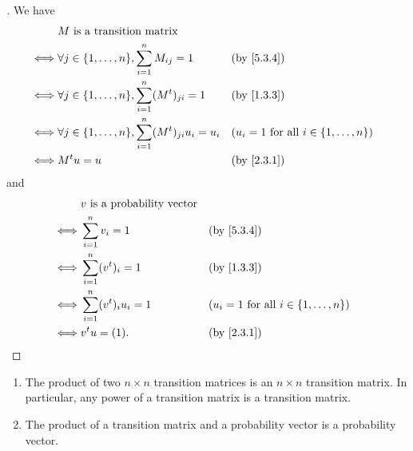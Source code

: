 \begin{proof}[]
	We have
	\begin{align*}
		     & M \text{ is a transition matrix}                                                                                                 \\
		\iff & \forall j \in \set{1, \dots, n}, \sum_{i = 1}^n M_{i j} = 1              &  & \by{5.3.4}                                         \\
		\iff & \forall j \in \set{1, \dots, n}, \sum_{i = 1}^n (\tp{M})_{j i} = 1       &  & \by{1.3.3}                                         \\
		\iff & \forall j \in \set{1, \dots, n}, \sum_{i = 1}^n (\tp{M})_{j i} u_i = u_i &  & (u_i = 1 \text{ for all } i \in \set{1, \dots, n}) \\
		\iff & \tp{M} u = u                                                             &  & \by{2.3.1}
	\end{align*}
	and
	\begin{align*}
		     & v \text{ is a probability vector}                                                         \\
		\iff & \sum_{i = 1}^n v_i = 1            &  & \by{5.3.4}                                         \\
		\iff & \sum_{i = 1}^n (\tp{v})_i = 1     &  & \by{1.3.3}                                         \\
		\iff & \sum_{i = 1}^n (\tp{v})_i u_i = 1 &  & (u_i = 1 \text{ for all } i \in \set{1, \dots, n}) \\
		\iff & \tp{v} u = (1).                   &  & \by{2.3.1}
	\end{align*}
\end{proof}

\begin{cor}\label{5.3.5}
	\begin{enumerate}
		\item The product of two \(n \times n\) transition matrices is an \(n \times n\) transition matrix.
		      In particular, any power of a transition matrix is a transition matrix.
		\item The product of a transition matrix and a probability vector is a probability vector.
	\end{enumerate}
\end{cor}

